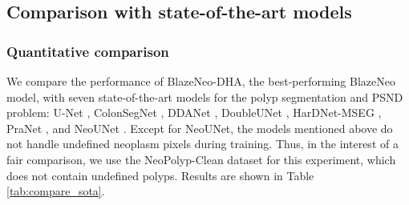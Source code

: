\documentclass{ieeeaccess}
\newcommand{\ModelName}{BlazeNeo\xspace}
\newcommand{\DHA}{BlazeNeo-DHA\xspace}
\newcommand{\CleanDatasetName}{NeoPolyp-Clean\xspace}
\begin{document}
\subsection{Comparison with state-of-the-art models}
\subsubsection{Quantitative comparison}
We compare the performance of \DHA, the best-performing \ModelName model, with seven state-of-the-art models for the polyp segmentation and PSND problem: U-Net \cite{ronneberger2015u}, ColonSegNet \cite{jha2021real}, DDANet \cite{tomar2020ddanet}, DoubleUNet \cite{jha2020doubleu},  HarDNet-MSEG \cite{huang2021hardnet}, PraNet \cite{fan2020pranet}, and NeoUNet \cite{lan2021neounet}. Except for NeoUNet, the models mentioned above do not handle undefined neoplasm pixels during training. Thus, in the interest of a fair comparison, we use the \CleanDatasetName dataset for this experiment, which does not contain undefined polyps. Results are shown in Table \ref{tab:compare_sota}.
\end{document}
